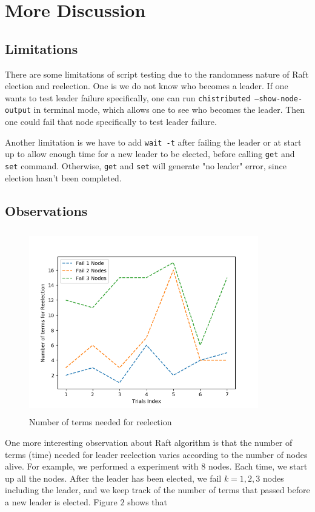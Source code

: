 \documentclass[11pt]{article}
\begin{document}
\section{More Discussion}
\subsection{Limitations}
There are some limitations of script testing due to the randomness nature of Raft election and reelection.
One is we do not know who becomes a leader. If one wants to test leader failure specifically, one can run \texttt{chistributed --show-node-output} in terminal mode, which allows one to see who becomes the leader. Then one could fail that node specifically to test leader failure.

Another limitation is we have to add \texttt{wait -t} after failing the leader or at start up to allow enough time for a new leader to be elected, before calling \texttt{get} and \texttt{set} command. Otherwise, \texttt{get} and \texttt{set} will generate "no leader" error, since election hasn't been completed. 

\subsection{Observations}

\begin{figure}[h]
  \centering
  \includegraphics[width=10cm, height=8cm]{Num_terms_reelection.png}
  \caption{Number of terms needed for reelection}
  \label{fig:speech_production}
\end{figure}


One more interesting observation about Raft algorithm is that the number of terms (time) needed for leader reelection varies according to the number of nodes alive. For example, we performed a experiment with $8$ nodes. Each time, we start up all the nodes. After the leader has been elected, we fail $k = 1,2,3$ nodes including the leader, and we keep track of the number of terms that passed before a new leader is elected. Figure $2$ shows that
\end{document}
